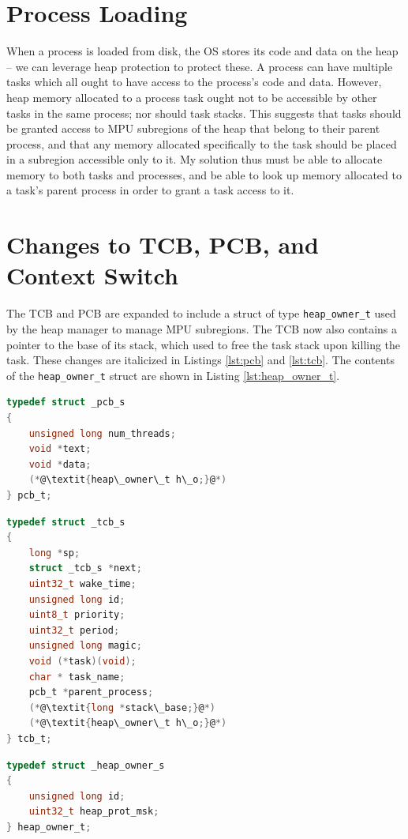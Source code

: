 \section{Process Loading}

When a process is loaded from disk, the OS stores its code and data on the heap -- we can leverage heap protection to protect these. A process can have multiple tasks which all ought to have access to the process's code and data. However, heap memory allocated to a process task ought not to be accessible by other tasks in the same process; nor should task stacks. This suggests that tasks should be granted access to MPU subregions of the heap that belong to their parent process, and that any memory allocated specifically to the task should be placed in a subregion accessible only to it. My solution thus must be able to allocate memory to both tasks and processes, and be able to look up memory allocated to a task's parent process in order to grant a task access to it.

\section{Changes to TCB, PCB, and Context Switch}

The TCB and PCB are expanded to include a struct of type \texttt{heap\_owner\_t} used by the heap manager to manage MPU subregions. The TCB now also contains a pointer to the base of its stack, which used to free the task stack upon killing the task. These changes are italicized in Listings \ref{lst:pcb} and \ref{lst:tcb}. The contents of the \texttt{heap\_owner\_t} struct are shown in Listing \ref{lst:heap_owner_t}.
\begin{lstlisting}[language=c, caption={Process Control Block definition}, captionpos=b, label={lst:pcb}, float]
typedef struct _pcb_s
{
    unsigned long num_threads;
    void *text;
    void *data;
    (*@\textit{heap\_owner\_t h\_o;}@*)
} pcb_t;
\end{lstlisting}
\begin{lstlisting}[language=c, caption={Task Control Block definition}, captionpos=b, label={lst:tcb}, float]
typedef struct _tcb_s
{
    long *sp;
    struct _tcb_s *next;
    uint32_t wake_time;
    unsigned long id;
    uint8_t priority;
    uint32_t period;
    unsigned long magic;
    void (*task)(void);
    char * task_name;
    pcb_t *parent_process;
    (*@\textit{long *stack\_base;}@*)
    (*@\textit{heap\_owner\_t h\_o;}@*)
} tcb_t;
\end{lstlisting}
\begin{lstlisting}[language=c, caption={heap\_owner\_t struct definition}, captionpos=b, label={lst:heap_owner_t}, float]
typedef struct _heap_owner_s
{
    unsigned long id;
    uint32_t heap_prot_msk;
} heap_owner_t;
\end{lstlisting}


